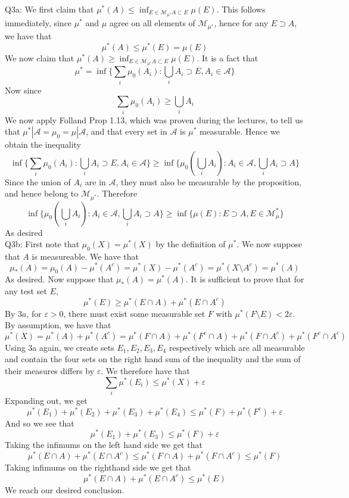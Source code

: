 \documentclass[letterpaper]{article}
\begin{document}
\noindent 
Q3a: We first claim that $\mu^*(A)\leq \inf_{E \in \mathcal{M}_{\mu^\ast} A \subset E}\mu(E)$. This follows immediately, since $\mu^\ast$ and $\mu$ agree on all elements of $\mathcal{M}_{\mu^\ast}$, hence for any $E \supset A$, we have that $$\mu^\ast(A) \leq \mu^{\ast}(E) = \mu(E)$$
We now claim that $\mu^\ast(A) \geq \inf_{E \in \mathcal{M}_{\mu^\ast} A \subset E}\mu(E)$. It is a fact that $$\mu^\ast = \inf \{\sum_{i}\mu_0(A_i): \bigcup_i A_i \supset E, A_i \in \mathcal{A} \}$$
Now since $$\sum_{i}\mu_0(A_i) \geq \bigcup_{i } A_i$$ We now apply Folland Prop 1.13, which was proven during the lectures, to tell us that $\mu^\ast |\mathcal{A} = \mu_0 = \mu|\mathcal{A}$, and that every set in $\mathcal{A}$ is $\mu^\ast$ measurable. Hence we obtain the inequality 
$$\inf \{\sum_{i}\mu_0(A_i): \bigcup_i A_i \supset E, A_i \in \mathcal{A} \} \geq \inf \{\mu_0(\bigcup_i A_i): A_i \in \mathcal{A}, \bigcup_i A_i \supset A\}$$
Since the union of $A_i$ are in $\mathcal{A}$, they must also be measurable by the proposition, and hence belong to $\mathcal{M}_{\mu^\ast}$. Therefore $$\inf \{\mu_0(\bigcup_i A_i): A_i \in \mathcal{A}, \bigcup_i A_i \supset A\} \geq \inf \{ \mu(E): E \supset A, E \in \mathcal{M}_\mu^\ast \}$$ 
As desired 
\newline \\ \noindent 
Q3b: First note that $\mu_0(X) = \mu^\ast (X)$ by the definition of $\mu^\ast$. We now suppose that $A$ is measureable. We have that $$\mu_\ast(A) = \mu_0(A)- \mu^\ast(A^c) = \mu^\ast(X) - \mu^\ast(A^c) = \mu^\ast(X \setminus A^c) = \mu^\ast(A)$$
As desired. Now suppose that $\mu_\ast (A) = \mu^\ast(A)$. It is sufficient to prove that for any test set $E$,  $$\mu^\ast(E) \geq \mu^\ast(E \cap A) + \mu^\ast (E \cap A^c)$$
By $3a$, for $\varepsilon>0$, there must exist some measurable set $F$ with $\mu^\ast(F \setminus E) < 2\varepsilon$. By assumption, we have that $$\mu^\ast(X) = \mu^\ast(A) + \mu^\ast(A^c) = \mu^\ast(F\cap A ) + \mu^\ast(F^c \cap A)+ \mu^\ast(F\cap A^c) + \mu^\ast(F^c \cap A^c) $$
Using 3a again, we create sets $E_1,E_2,E_3,E_4$ respectively which are all measurable and contain the four sets on the right hand sum of the inequality and the sum of their measures differs by $\varepsilon$. We therefore have that $$\sum_i \mu^\ast(E_i) \leq \mu^\ast(X) + \varepsilon$$ Expanding out, we get $$\mu^\ast(E_1) + \mu^\ast(E_2) + \mu^\ast(E_3) + \mu^\ast(E_4) \leq \mu^\ast(F) + \mu^\ast(F^c) + \varepsilon$$
And so we see that $$\mu^\ast(E_1) + \mu^\ast(E_3) \leq \mu^\ast(F) + \varepsilon$$
Taking the infimums on the left hand side we get that $$\mu^\ast(E\cap A)+ \mu^\ast(E\cap A^c) \leq \mu^\ast(F \cap A)+ \mu^\ast(F \cap A^c)\leq \mu^\ast(F)$$
Taking infimums on the righthand side we get that $$\mu^\ast(E\cap A)+ \mu^\ast(E\cap A^c) \leq \mu^\ast(E)$$
We reach our desired conclusion.
\end{document}
